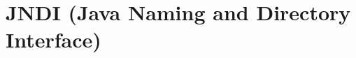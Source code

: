 \chapter{JNDI (Java Naming and Directory Interface)}
\label{JNDI}
\thispagestyle{chapternohead}

	
\pagestyle{ruledfilip}















